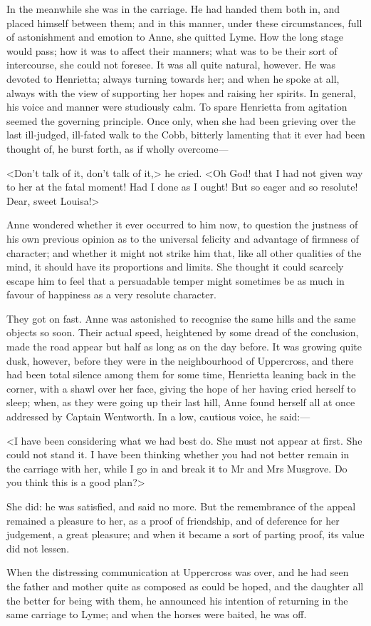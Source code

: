 In the meanwhile she was in the carriage. He had handed them both in, and placed himself between them; and in this manner, under these circumstances, full of astonishment and emotion to Anne, she quitted Lyme. How the long stage would pass; how it was to affect their manners; what was to be their sort of intercourse, she could not foresee. It was all quite natural, however. He was devoted to Henrietta; always turning towards her; and when he spoke at all, always with the view of supporting her hopes and raising her spirits. In general, his voice and manner were studiously calm. To spare Henrietta from agitation seemed the governing principle. Once only, when she had been grieving over the last ill-judged, ill-fated walk to the Cobb, bitterly lamenting that it ever had been thought of, he burst forth, as if wholly overcome—

<Don't talk of it, don't talk of it,> he cried. <Oh God! that I had not given way to her at the fatal moment! Had I done as I ought! But so eager and so resolute! Dear, sweet Louisa!>

Anne wondered whether it ever occurred to him now, to question the justness of his own previous opinion as to the universal felicity and advantage of firmness of character; and whether it might not strike him that, like all other qualities of the mind, it should have its proportions and limits. She thought it could scarcely escape him to feel that a persuadable temper might sometimes be as much in favour of happiness as a very resolute character.

They got on fast. Anne was astonished to recognise the same hills and the same objects so soon. Their actual speed, heightened by some dread of the conclusion, made the road appear but half as long as on the day before. It was growing quite dusk, however, before they were in the neighbourhood of Uppercross, and there had been total silence among them for some time, Henrietta leaning back in the corner, with a shawl over her face, giving the hope of her having cried herself to sleep; when, as they were going up their last hill, Anne found herself all at once addressed by Captain Wentworth. In a low, cautious voice, he said:—

<I have been considering what we had best do. She must not appear at first. She could not stand it. I have been thinking whether you had not better remain in the carriage with her, while I go in and break it to Mr and Mrs Musgrove. Do you think this is a good plan?>

She did: he was satisfied, and said no more. But the remembrance of the appeal remained a pleasure to her, as a proof of friendship, and of deference for her judgement, a great pleasure; and when it became a sort of parting proof, its value did not lessen.

When the distressing communication at Uppercross was over, and he had seen the father and mother quite as composed as could be hoped, and the daughter all the better for being with them, he announced his intention of returning in the same carriage to Lyme; and when the horses were baited, he was off.